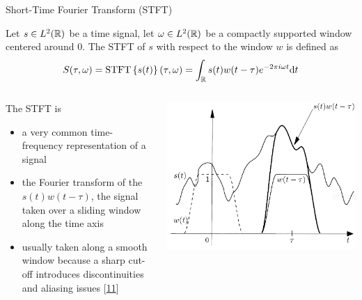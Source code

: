 \documentclass[10pt,american,ignorenonframetext,aspectratio=1610]{beamer}
\providecommand{\tightlist}{%
  \setlength{\itemsep}{0pt}\setlength{\parskip}{0pt}}
\theoremstyle{remark}
\begin{document}
\begin{frame}{Short-Time Fourier Transform (STFT)}
\protect\hypertarget{short-time-fourier-transform-stft}{}

\begin{definition}
Let $s\in L^2(\mathbb{R})$ be a time signal, let $\omega\in L^2(\mathbb{R})$ be a compactly supported window
centered around $0$.
The STFT of $s$ with respect to the window $w$ is defined as
$$S(\tau,\omega) = \mathrm{STFT}\left\{s(t)\right\}(\tau,\omega) = \int_{\mathbb{R}} s(t)w(t-\tau)e^{-2\pi i\omega t} \mathrm{d}t$$
\end{definition}

\begin{columns}[T]
\begin{column}{0.6\textwidth}
The STFT is

\begin{itemize}
\tightlist
\item
  a very common time-frequency representation of a signal
\item
  the Fourier transform of the \(s(t)w(t-\tau)\), the signal taken over
  a sliding window along the time axis
\item
  usually taken along a smooth window because a sharp cut-off introduces
  discontinuities and aliasing issues
  {[}\protect\hyperlink{ref-grochenig2001}{11}{]}
\end{itemize}
\end{column}

\begin{column}{0.4\textwidth}
\includegraphics{img/stft_grochenig.png}
\end{column}
\end{columns}

\end{frame}
\end{document}
